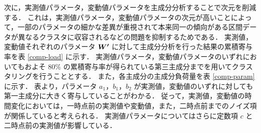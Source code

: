 \documentclass[technicalreport]{ieicej}
\begin{document}
次に，実測値パラメータ，変動値パラメータを主成分分析\cite{jolliffe2016principal}することで次元を削減する．
これは，実測値パラメータ，変動値パラメータの次元が高いことによって，一部のパラメータの細かな差異が重視されて本来同一の傾向がある区間データが異なるクラスタに収容されるなどの問題を抑制するためである．
実測値，変動値それぞれのパラメータ $\mbox{\boldmath $W^\prime$}$ に対して主成分分析を行った結果の累積寄与率を表 \ref{comp-load} に示す．
実測値パラメータ，変動値パラメータのいずれにおいてもおよそ $80\%$ の累積寄与率が得られている第三主成分までを用いてクラスタリングを行うこととする．
また，各主成分の主成分負荷量を表 \ref{comp-param} に示す．
表より，パラメータ $a_1，b_1，b_2$ が実測値，変動値のいずれに対しても第一主成分に大きく寄与していることがわかる．
従って，実測値，変動値の時間変化においては，一時点前の実測値や変動値，また，二時点前までのノイズ項が関係していると考えられる．
実測値パラメータについてはさらに定数項 $c$ と二時点前の実測値が影響している．

\begin{table}[tb]
\begin{center}
\caption{累積寄与率}
\label{comp-load}
\\
\end{center}
\end{table}
\end{document}
